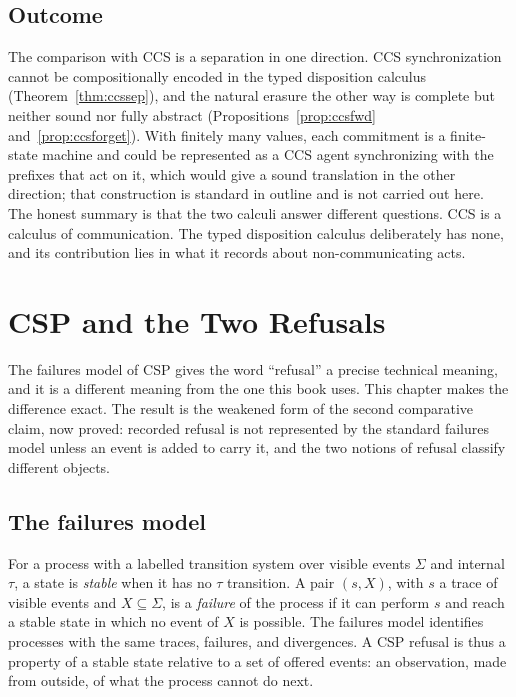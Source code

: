 \documentclass[11pt,openany]{book}
\theoremstyle{remark}
\begin{document}
\section{Outcome}

The comparison with CCS is a separation in one direction. CCS
synchronization cannot be compositionally encoded in the typed
disposition calculus (Theorem~\ref{thm:ccssep}), and the natural erasure
the other way is complete but neither sound nor fully abstract
(Propositions~\ref{prop:ccsfwd} and~\ref{prop:ccsforget}). With finitely
many values, each commitment is a finite-state machine and could be
represented as a CCS agent synchronizing with the prefixes that act on it,
which would give a sound translation in the other direction; that
construction is standard in outline and is not carried out here. The
honest summary is that the two calculi answer different questions. CCS is
a calculus of communication. The typed disposition calculus deliberately
has none, and its contribution lies in what it records about
non-communicating acts.

\chapter{CSP and the Two Refusals}
\label{ch:csp}

The failures model of CSP gives the word ``refusal'' a precise technical
meaning, and it is a different meaning from the one this book uses. This
chapter makes the difference exact. The result is the weakened form of the
second comparative claim, now proved: recorded refusal is not represented
by the standard failures model unless an event is added to carry it, and
the two notions of refusal classify different objects.

\section{The failures model}

For a process with a labelled transition system over visible events
$\Sigma$ and internal $\tau$, a state is \emph{stable} when it has no
$\tau$ transition. A pair $(s,X)$, with $s$ a trace of visible events and
$X\subseteq\Sigma$, is a \emph{failure} of the process if it can perform
$s$ and reach a stable state in which no event of $X$ is possible. The
failures model identifies processes with the same traces, failures, and
divergences. A CSP refusal is thus a property of a stable state relative
to a set of offered events: an observation, made from outside, of what the
process cannot do next.
\end{document}
